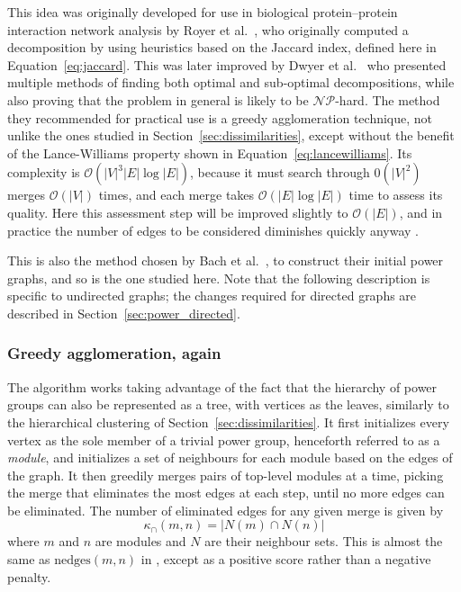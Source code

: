 This idea was originally developed for use in biological protein--protein interaction network analysis by Royer et al.\ \cite{Royer2008}, who originally computed a decomposition by using heuristics based on the Jaccard index, defined here in Equation~\ref{eq:jaccard}. This was later improved by Dwyer et al.\ \cite{Dwyer2014} who presented multiple methods of finding both optimal and sub-optimal decompositions, while also proving that the problem in general is likely to be $\mathcal{NP}$-hard. The method they recommended for practical use is a greedy agglomeration technique, not unlike the ones studied in Section~\ref{sec:dissimilarities}, except without the benefit of the Lance-Williams property shown in Equation~\eqref{eq:lancewilliams}. Its complexity is $\mathcal{O}(|V|^3|E|\log|E|)$, because it must search through $\mathcal{0}(|V|^2)$ merges $\mathcal{O}(|V|)$ times, and each merge takes $\mathcal{O}(|E|\log|E|)$ time to assess its quality. Here this assessment step will be improved slightly to $\mathcal{O}(|E|)$, and in practice the number of edges to be considered diminishes quickly anyway \cite{Dwyer2014}.

This is also the method chosen by Bach et al.\ \cite{Bach2017}, to construct their initial power graphs, and so is the one studied here. Note that the following description is specific to undirected graphs; the changes required for directed graphs are described in Section~\ref{sec:power_directed}.

\subsubsection{Greedy agglomeration, again}
The algorithm works taking advantage of the fact that the hierarchy of power groups can also be represented as a tree, with vertices as the leaves, similarly to the hierarchical clustering of Section~\ref{sec:dissimilarities}. It first initializes every vertex as the sole member of a trivial power group, henceforth referred to as a \emph{module}, and initializes a set of neighbours for each module based on the edges of the graph.
It then greedily merges pairs of top-level modules at a time, picking the merge that eliminates the most edges at each step, until no more edges can be eliminated.
The number of eliminated edges for any given merge is given by
\begin{equation}
  \kappa_{\cap}(m, n) = |N(m)\cap N(n)|
  \label{eq:kappa_cap}
\end{equation}
where $m$ and $n$ are modules and $N$ are their neighbour sets.
This is almost the same as $\mathrm{nedges}(m,n)$ in \cite{Dwyer2014}, except as a positive score rather than a negative penalty.


